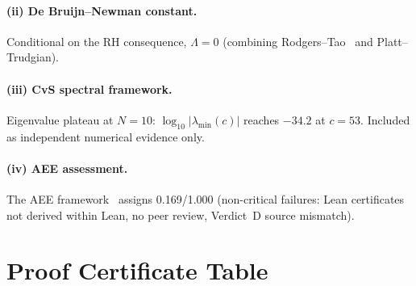 \documentclass[11pt]{article}
\theoremstyle{definition}
\theoremstyle{remark}
\begin{document}
\paragraph{(ii) De Bruijn--Newman constant.}
Conditional on the RH consequence, $\Lambda = 0$ (combining Rodgers--Tao~\cite{rodgers2020}
and Platt--Trudgian).

\paragraph{(iii) CvS spectral framework.}
Eigenvalue plateau at $N = 10$: $\log_{10}|\lambda_{\min}(c)|$ reaches $-34.2$ at $c = 53$.
Included as independent numerical evidence only.

\paragraph{(iv) AEE assessment.}
The AEE framework~\cite{specsmith} assigns 0.169/1.000 (non-critical failures: Lean
certificates not derived within Lean, no peer review, Verdict~D source mismatch).

\section{Proof Certificate Table}\label{sec:cert}
\end{document}
